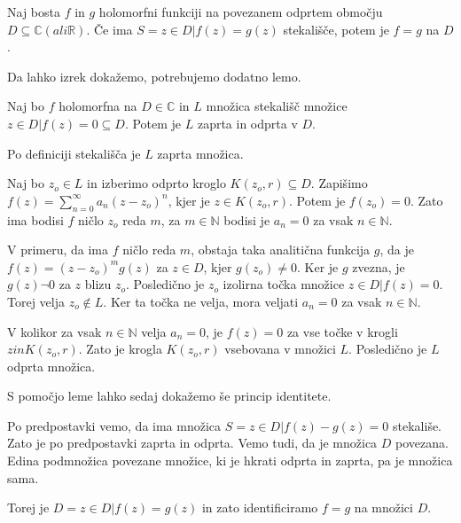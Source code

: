 \documentclass[mat1]{fmfdelo}
\begin{document}
\begin{izrek}
    Naj bosta $f$ in $g$ holomorfni funkciji na povezanem odprtem območju $D \subseteq \mathbb{C} (ali \mathbb{R})$.
    Če ima $S = { z \in D | f(z) = g(z) }$ stekališče, potem je $f = g$ na $D$.
\end{izrek}

Da lahko izrek dokažemo, potrebujemo dodatno lemo.

\begin{lema}
    Naj bo $f$ holomorfna na $D \in \mathbb{C}$ in $L$ množica stekališč množice ${ z \in D | f(z) = 0 } \subseteq D$.
    Potem je $L$ zaprta in odprta v $D$.
\end{lema}

\begin{dokaz}
    Po definiciji stekališča je $L$ zaprta množica.

    Naj bo $z_o \in L$ in izberimo odprto kroglo $K (z_o, r) \subseteq D$.
    Zapišimo $ f(z) = \sum_{n = 0}^{\infty} a_n (z - z_o)^n $, kjer je $z \in K (z_o, r)$.
    Potem je $f(z_o) = 0$. Zato ima bodisi $f$ ničlo $z_o$ reda $m$, za $m \in \mathbb{N}$ bodisi je $a_n = 0$ za vsak $n \in \mathbb{N}$.

    V primeru, da ima $f$ ničlo reda $m$, obstaja taka analitična funkcija $g$, da je $f(z) = (z - z_o)^m  g(z)$ za $z \in D$,
    kjer $g(z_o) \neq 0$. Ker je $g$ zvezna, je $g(z) \neg 0$ za $z$ blizu $z_o$. Posledično je $z_o$ izolirna točka množice
    ${ z \in D | f(z) = 0 }$. Torej velja $z_o \notin L$. Ker ta točka ne velja, mora veljati $a_n = 0$ za vsak $n \in \mathbb{N}$.

    V kolikor za vsak $n \in \mathbb{N}$ velja $a_n = 0$, je $f(z) = 0$ za vse točke v krogli $z in K(z_o, r)$. Zato je krogla $K(z_o, r)$ 
    vsebovana v množici $L$. Posledično je $L$ odprta množica.
\end{dokaz}


S pomočjo leme lahko sedaj dokažemo še princip identitete.

\begin{dokaz}
    Po predpostavki vemo, da ima množica $S = { z \in D | f(z) - g(z) = 0 }$ stekališe.
    Zato je po predpostavki zaprta in odprta. Vemo tudi, da je množica $D$ povezana. Edina podmnožica 
    povezane množice, ki je hkrati odprta in zaprta, pa je množica sama. 

    Torej je $D = { z \in D | f(z) = g(z) }$ in zato identificiramo $f = g$ na množici $D$.
\end{dokaz}
\end{document}
